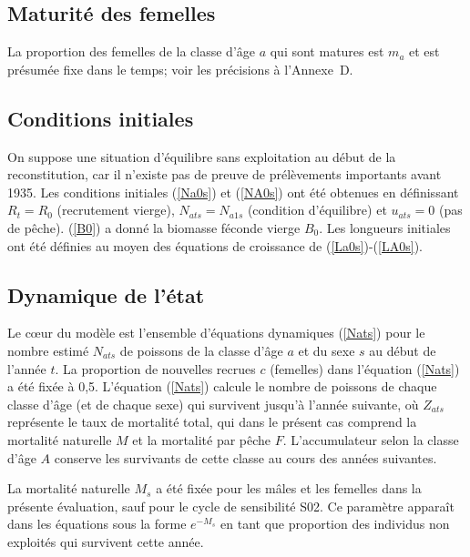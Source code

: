 \documentclass[11pt]{book}
\newcommand{\AppBio}{Annexe~D}
\newcommand{\eref}[1]{(\ref{#1})}
\begin{document}
\subsection{Maturit\'{e} des femelles}

La proportion des femelles de la classe d'\^{a}ge $a$ qui sont matures est $m_a$ et est pr\'{e}sum\'{e}e fixe dans le temps; voir les pr\'{e}cisions \`{a} l'\AppBio{}.

\subsection{Conditions initiales}

On suppose une situation d'\'{e}quilibre sans exploitation au d\'{e}but de la reconstitution, car il n'existe pas de preuve de pr\'{e}l\`{e}vements importants avant 1935.
Les conditions initiales \eref{Na0s} et \eref{NA0s} ont \'{e}t\'{e} obtenues en d\'{e}finissant $R_t = R_0$ (recrutement vierge), $N_{ats} = N_{a1s}$ (condition d'\'{e}quilibre) et $u_{ats} = 0$ (pas de p\^{e}che).
\eref{B0} a donn\'{e} la biomasse f\'{e}conde vierge $B_0$.
Les longueurs initiales ont \'{e}t\'{e} d\'{e}finies au moyen des \'{e}quations de croissance de \citet{Schnute:1981} \eref{La0s}-\eref{LA0s}.

\subsection{Dynamique de l'\'{e}tat}

Le c{\oe}ur du mod\`{e}le est l'ensemble d'\'{e}quations dynamiques \eref{Nats} pour le nombre estim\'{e} $N_{ats}$ de poissons de la classe d'\^{a}ge $a$ et du sexe $s$ au d\'{e}but de l'ann\'{e}e $t$.
La proportion de nouvelles recrues $c$ (femelles) dans l'\'{e}quation \eref{Nats} a \'{e}t\'{e} fix\'{e}e \`{a} 0,5.
L'\'{e}quation \eref{Nats} calcule le nombre de poissons de chaque classe d'\^{a}ge (et de chaque sexe) qui survivent jusqu'\`{a} l'ann\'{e}e suivante, o\`{u} $Z_{ats}$ repr\'{e}sente le taux de mortalit\'{e} total, qui dans le pr\'{e}sent cas comprend la mortalit\'{e} naturelle $M$ et la mortalit\'{e} par p\^{e}che $F$.
L'accumulateur selon la classe d'\^{a}ge $A$ conserve les survivants de cette classe au cours des ann\'{e}es suivantes.

La mortalit\'{e} naturelle $M_s$ a \'{e}t\'{e} fix\'{e}e pour les m\^{a}les et les femelles dans la pr\'{e}sente \'{e}valuation, sauf pour le cycle de sensibilit\'{e} S02.
Ce param\`{e}tre appara\^{i}t dans les \'{e}quations sous la forme $e^{-M_s}$ en tant que proportion des individus non exploit\'{e}s qui survivent cette ann\'{e}e.
\end{document}
